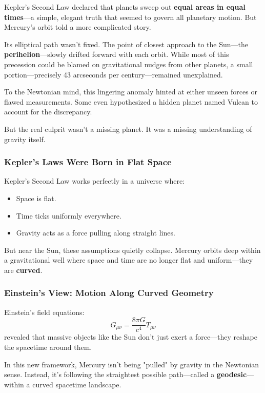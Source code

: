 Kepler’s Second Law declared that planets sweep out \textbf{equal areas in equal times}—a simple, elegant truth that seemed to govern all planetary motion. But Mercury’s orbit told a more complicated story.

Its elliptical path wasn’t fixed. The point of closest approach to the Sun—the \textbf{perihelion}—slowly drifted forward with each orbit. While most of this precession could be blamed on gravitational nudges from other planets, a small portion—precisely 43 arcseconds per century—remained unexplained.

To the Newtonian mind, this lingering anomaly hinted at either unseen forces or flawed measurements. Some even hypothesized a hidden planet named Vulcan to account for the discrepancy.

But the real culprit wasn’t a missing planet. It was a missing understanding of gravity itself.

\subsubsection*{Kepler’s Laws Were Born in Flat Space}

Kepler’s Second Law works perfectly in a universe where:

\begin{itemize}
  \item Space is flat.
  \item Time ticks uniformly everywhere.
  \item Gravity acts as a force pulling along straight lines.
\end{itemize}

But near the Sun, these assumptions quietly collapse. Mercury orbits deep within a gravitational well where space and time are no longer flat and uniform—they are \textbf{curved}.

\subsubsection*{Einstein’s View: Motion Along Curved Geometry}

Einstein’s field equations:
\[
G_{\mu\nu} = \frac{8\pi G}{c^4} T_{\mu\nu}
\]
revealed that massive objects like the Sun don’t just exert a force—they reshape the spacetime around them.

In this new framework, Mercury isn’t being "pulled" by gravity in the Newtonian sense. Instead, it’s following the straightest possible path—called a \textbf{geodesic}—within a curved spacetime landscape.

